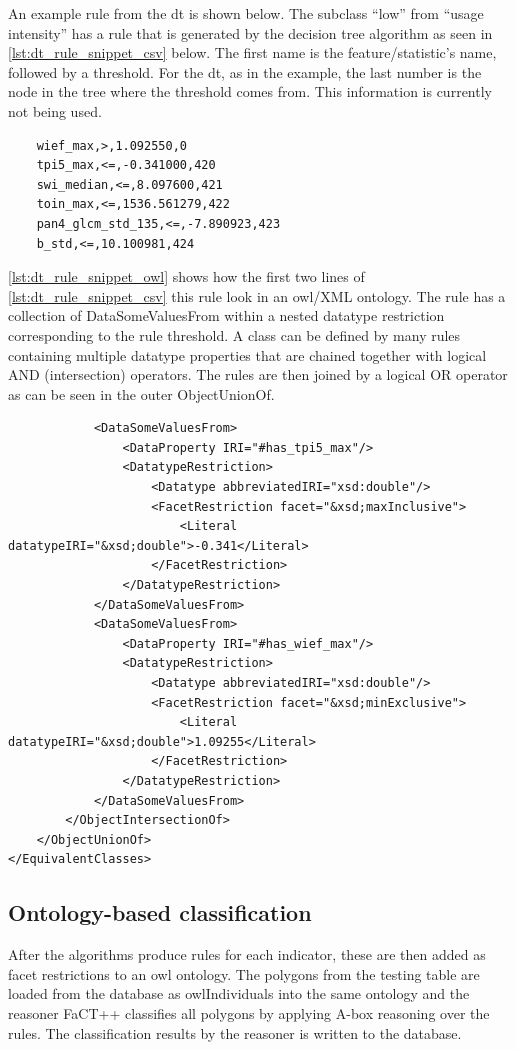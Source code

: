 \documentclass[authoryear,preprint,12pt,number]{elsarticle}
\begin{document}
An example rule from the \gls{dt} is shown below. The subclass ``low'' from 
``usage intensity'' has a rule that is generated by the decision tree algorithm 
as seen in \ref{lst:dt_rule_snippet_csv} below. The first name is the 
feature/statistic's name, followed by a threshold. For the \gls{dt}, as in the 
example, the last number is the node in the tree where the threshold comes 
from. This information is currently not being used.
\lstset{language=XML,tabsize=2, label=lst:dt_rule_snippet_csv, caption=\lstname}
\begin{lstlisting}
    wief_max,>,1.092550,0
    tpi5_max,<=,-0.341000,420
    swi_median,<=,8.097600,421
    toin_max,<=,1536.561279,422
    pan4_glcm_std_135,<=,-7.890923,423
    b_std,<=,10.100981,424
\end{lstlisting}
\ref{lst:dt_rule_snippet_owl} shows how the first two lines of 
\ref{lst:dt_rule_snippet_csv} this rule look in an \gls{owl}/XML ontology. The 
rule has a collection of DataSomeValuesFrom within a nested datatype restriction 
corresponding to the rule threshold. A class can be defined by many rules 
containing multiple datatype properties that are chained together with logical 
AND (intersection) operators. The rules are then joined by a logical OR operator 
as can be seen in the outer ObjectUnionOf. 

\lstset{language=XML,tabsize=2, label=lst:dt_rule_snippet_owl, 
caption=\lstname}
\begin{lstlisting}
            <DataSomeValuesFrom>
                <DataProperty IRI="#has_tpi5_max"/>
                <DatatypeRestriction>
                    <Datatype abbreviatedIRI="xsd:double"/>
                    <FacetRestriction facet="&xsd;maxInclusive">
                        <Literal datatypeIRI="&xsd;double">-0.341</Literal>
                    </FacetRestriction>
                </DatatypeRestriction>
            </DataSomeValuesFrom>
            <DataSomeValuesFrom>
                <DataProperty IRI="#has_wief_max"/>
                <DatatypeRestriction>
                    <Datatype abbreviatedIRI="xsd:double"/>
                    <FacetRestriction facet="&xsd;minExclusive">
                        <Literal datatypeIRI="&xsd;double">1.09255</Literal>
                    </FacetRestriction>
                </DatatypeRestriction>
            </DataSomeValuesFrom>
        </ObjectIntersectionOf>
    </ObjectUnionOf>
</EquivalentClasses>
\end{lstlisting}
\subsection{Ontology-based classification}
\label{subsec:Onto_classification}
After the algorithms produce rules for each indicator, these are then added as 
facet restrictions to an \gls{owl} ontology. The polygons from the testing 
table 
are 
loaded from the database as \gls{owl}Individuals into the same ontology and the 
reasoner FaCT++ classifies all polygons by applying A-box reasoning over the 
rules. The classification results by the reasoner is written to the database. 
\end{document}
